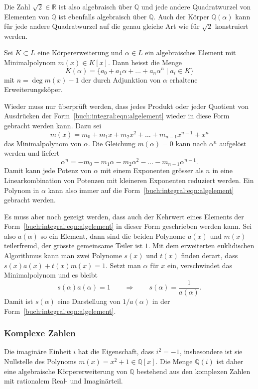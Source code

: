 Die Zahl $\sqrt{2}\in\mathbb{R}$ ist also algebraisch über $\mathbb{Q}$
und jede andere Quadratwurzel von Elementen von $\mathbb{Q}$ ist
ebenfalls algebraisch über $\mathbb{Q}$.
Auch der Körper $\mathbb{Q}(\alpha)$ kann für jede andere Quadratwurzel
auf die genau gleiche Art wie für $\sqrt{2}$ konstruiert werden.

\begin{definition}
\label{buch:integral:definition:algebraischeerweiterung}
Sei $K\subset L$ eine Körpererweiterung und $\alpha\in L$ ein algebraisches
Element mit Minimalpolynom $m(x)\in K[x]$.
Dann heisst die Menge
\begin{equation}
K(\alpha)
=
\{
a_0 + a_1\alpha + \ldots +a_n\alpha^n
\;|\;
a_i\in K
\}
\label{buch:integral:eqn:algelement}
\end{equation}
mit $n=\deg m(x) - 1$ der durch Adjunktion von $\alpha$ erhaltene
Erweiterungsköper.
\end{definition}

Wieder muss nur überprüft werden, dass jedes Produkt oder jeder
Quotient von Ausdrücken der Form~\eqref{buch:integral:eqn:algelement}
wieder in diese Form gebracht werden kann.
Dazu sei
\[
m(x)
=
m_0+m_1x + m_2x^2
+\ldots +m_{n-1}x^{n-1} + x^n
\]
das Minimalpolynom von $\alpha$.
Die Gleichung $m(\alpha)=0$ kann nach $\alpha^n$ aufgelöst werden und
liefert
\[
\alpha^n = -m_0 - m_1\alpha - m_2\alpha^2 -\ldots -m_{n-1}\alpha^{n-1}.
\]
Damit kann jede Potenz von $\alpha$ mit einem Exponenten grösser als $n$
in eine Linearkombination von Potenzen mit kleineren Exponenten
reduziert werden.
Ein Polynom in $\alpha$ kann also immer auf die
Form~\eqref{buch:integral:eqn:algelement}
gebracht werden.

Es muss aber noch gezeigt werden, dass auch der Kehrwert eines Elements
der Form~\eqref{buch:integral:eqn:algelement} in dieser Form geschrieben
werden kann.
Sei also $a(\alpha)$ so ein Element, dann sind die beiden Polynome
$a(x)$ und $m(x)$ teilerfremd, der grösste gemeinsame Teiler ist $1$.
Mit dem erweiterten euklidischen Algorithmus kann man zwei Polynome
$s(x)$ und $t(x)$ finden derart, dass $s(x)a(x)+t(x)m(x)=1$.
Setzt man $\alpha$ für $x$ ein, verschwindet das Minimalpolynom und
es bleibt
\[
s(\alpha)a(\alpha) = 1
\qquad\Rightarrow\qquad
s(\alpha) = \frac{1}{a(\alpha)}.
\]
Damit ist $s(\alpha)$ eine Darstellung von $1/a(\alpha)$ in der 
Form~\eqref{buch:integral:eqn:algelement}.

%
%
\subsubsection{Komplexe Zahlen}
Die imaginäre Einheit $i$ hat die Eigenschaft, dass $i^2=-1$, insbesondere
ist sie Nullstelle des Polynoms $m(x)=x^2+1\in\mathbb{Q}[x]$.
Die Menge $\mathbb{Q}(i)$ ist daher eine algebraische Körpererweiterung
von $\mathbb{Q}$ bestehend aus den komplexen Zahlen mit rationalem
Real- und Imaginärteil.

